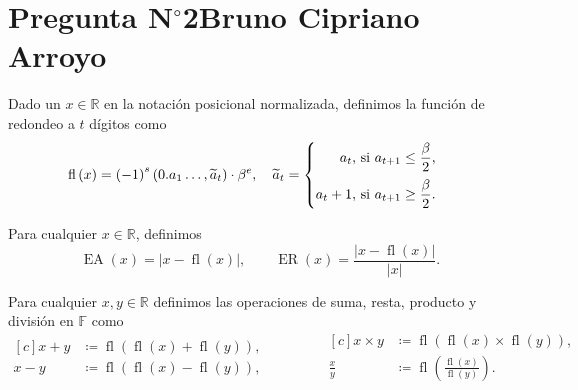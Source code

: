 \section{Pregunta N$^{\circ}$2\qquad Bruno Cipriano Arroyo}

\begin{frame}
	\begin{definition}[Redondeo]
		Dado un $x\in\mathbb{R}$ en la notación posicional normalizada,
		definimos la función de redondeo a $t$ dígitos como
		\begin{equation*}
			\operatorname{fl}\left(x\right)=
			{\left(-1\right)}^{s}
			\left(
			0.a_{1}\dotsc,\widetilde{a}_{t}
			\right)\cdot
			\beta^{e},\quad
			\widetilde{a}_{t}=
			\begin{cases}
				\begin{aligned}
					a_{t},
					 & \text{ si }a_{t+1}\leq\frac{\beta}{2}, \\[\baselineskip]
					a_{t}+1,
					 & \text{ si }a_{t+1}\geq\frac{\beta}{2}.
				\end{aligned}
			\end{cases}
		\end{equation*}
	\end{definition}

	\begin{definition}
		Para cualquier $x\in\mathbb{R}$, definimos
		\begin{equation*}
			\operatorname{EA}\left(x\right)=
			\left|
			x-
			\operatorname{fl}\left(x\right)\right|,\qquad
			\operatorname{ER}\left(x\right)=
			\frac{
				\left|
				x-
				\operatorname{fl}\left(x\right)\right|
			}{
				\left|
				x
				\right|
			}.
		\end{equation*}
	\end{definition}

	\begin{definition}
		Para cualquier $x,y\in\mathbb{R}$ definimos las operaciones de
		suma, resta, producto y división en $\mathbb{F}$ como
		\begin{equation*}
			\begin{aligned}[c]
				x+y & \coloneqq
				\operatorname{fl}
				\left(
				\operatorname{fl}\left(x\right)+
				\operatorname{fl}\left(y\right)
				\right),        \\
				x-y & \coloneqq
				\operatorname{fl}
				\left(
				\operatorname{fl}\left(x\right)-
				\operatorname{fl}\left(y\right)
				\right),
			\end{aligned}
			\qquad\qquad
			\begin{aligned}[c]
				x\times y   & \coloneqq
				\operatorname{fl}
				\left(
				\operatorname{fl}\left(x\right)\times
				\operatorname{fl}\left(y\right)
				\right),                \\
				\frac{x}{y} & \coloneqq
				\operatorname{fl}
				\left(
				\frac{
					\operatorname{fl}\left(x\right)
				}{
					\operatorname{fl}\left(y\right)
				}
				\right).
			\end{aligned}
		\end{equation*}
	\end{definition}
\end{frame}

